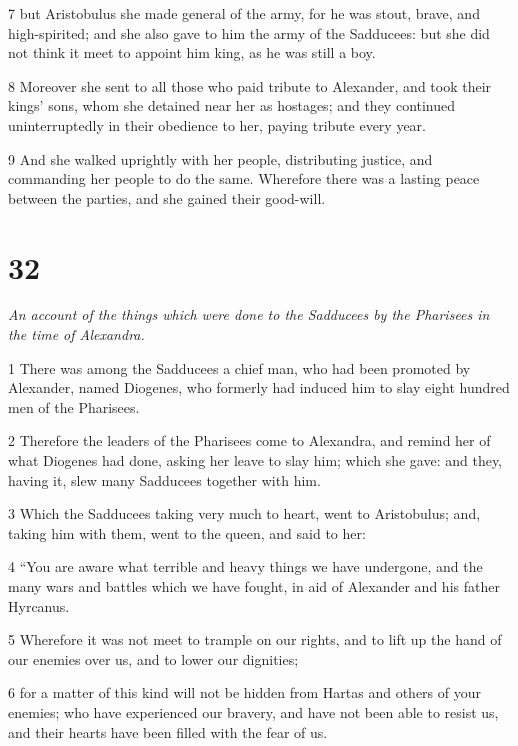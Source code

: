 \par 7 but Aristobulus she made general of the army, for he was stout, brave, and high-spirited; and she also gave to him the army of the Sadducees: but she did not think it meet to appoint him king, as he was still a boy. 

\par 8 Moreover she sent to all those who paid tribute to Alexander, and took their kings’ sons, whom she detained near her as hostages; and they continued uninterruptedly in their obedience to her, paying tribute every year. 

\par 9 And she walked uprightly with her people, distributing justice, and commanding her people to do the same. Wherefore there was a lasting peace between the parties, and she gained their good-will. 

\chapter{32}

\par \textit{An account of the things which were done to the Sadducees by the Pharisees in the time of Alexandra.}

\par 1 There was among the Sadducees a chief man, who had been promoted by Alexander, named Diogenes, who formerly had induced him to slay eight hundred men of the Pharisees. 

\par 2 Therefore the leaders of the Pharisees come to Alexandra, and remind her of what Diogenes had done, asking her leave to slay him; which she gave: and they, having it, slew many Sadducees together with him. 

\par 3 Which the Sadducees taking very much to heart, went to Aristobulus; and, taking him with them, went to the queen, and said to her: 

\par 4 “You are aware what terrible and heavy things we have undergone, and the many wars and battles which we have fought, in aid of Alexander and his father Hyrcanus. 

\par 5 Wherefore it was not meet to trample on our rights, and to lift up the hand of our enemies over us, and to lower our dignities; 

\par 6 for a matter of this kind will not be hidden from Hartas and others of your enemies; who have experienced our bravery, and have not been able to resist us, and their hearts have been filled with the fear of us. 

